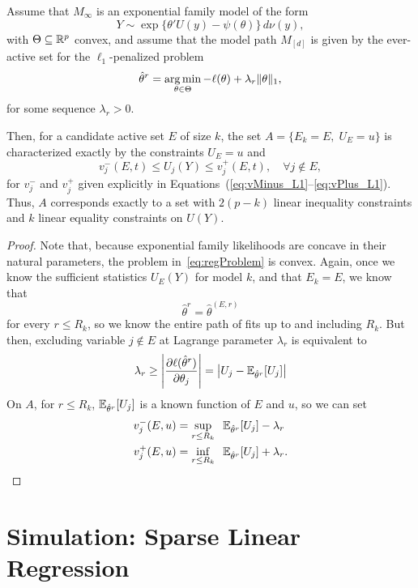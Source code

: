 \documentclass{article}
\begin{document}
\begin{theorem}
  Assume that $M_\infty$ is an exponential family model
  of the form
  \[
  Y \sim \exp\{ \theta'U(y) - \psi(\theta) \}\,d\nu(y),
  \]
  with $\Theta \subseteq \mathbb{R}^p$ convex, and assume
  that the model path $M_{[d]}$ is given 
  by the ever-active set for the $\ell_1$-penalized problem
  \begin{equation}\label{eq:regProblem}
  \hat\theta^r = \operatorname*{arg\,min}_{\theta\in \Theta} 
  -\ell(\theta) + \lambda_r\|\theta\|_1,
  \end{equation}
  for some sequence $\lambda_r > 0$.

  Then, for a candidate active set $E$ of size $k$, 
  the set $A = \{E_k = E, \;U_E = u\}$ is characterized 
  exactly by the constraints $U_E = u$ and
  \[
  v_j^-(E,t) \leq U_j(Y) \leq v_j^+(E,t), \quad\forall j \notin E,
  \]
  for $v_j^-$ and $v_j^+$ given explicitly in
  Equations~(\ref{eq:vMinus_L1}--\ref{eq:vPlus_L1}).
  Thus, $A$ corresponds exactly to 
  a set with $2(p-k)$ linear inequality constraints and $k$
  linear equality constraints on $U(Y)$.
\end{theorem}

\begin{proof}
  Note that, because exponential family likelihoods are concave in their natural parameters, the problem in~\eqref{eq:regProblem} is convex. Again, once we know the sufficient statistics $U_E(Y)$ for model $k$, and that $E_k=E$, we know that
  \[
  \hat\theta^r = \hat\theta^{(E,r)}
  \]
  for every $r \leq R_k$, so we know the entire path of fits up to and including $R_k$. But then, excluding variable $j \notin E$ at Lagrange parameter $\lambda_r$ is equivalent to
  \[
  \lambda_r \geq 
  \left| \frac{\partial \ell(\hat\theta^r)}{\partial \theta_j} \right|
  = \left|U_j - \mathbb{E}_{\hat\theta^r}[U_j]\right|
  \]
  On $A$, for $r \leq R_k$, 
  $\mathbb{E}_{\hat\theta^r}[U_j]$ is a known function of $E$ and $u$,
  so we can set
  \begin{align}\label{eq:vMinus_L1}
    v_j^-(E,u) &= \sup_{r \leq R_k} \;\; 
    \mathbb{E}_{\hat\theta^r}[U_j] - \lambda_r \\
    \label{eq:vPlus_L1}
    v_j^+(E,u) &= \inf_{r \leq R_k} \;\;
    \mathbb{E}_{\hat\theta^r}[U_j] + \lambda_r .
  \end{align}
\end{proof}



\section{Simulation: Sparse Linear Regression}\label{sec:sparseReg}
\end{document}
